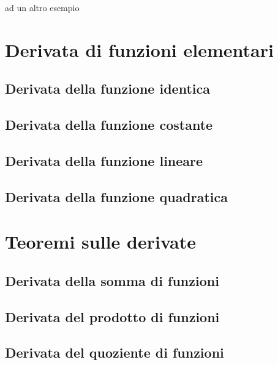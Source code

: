 ad un 
altro esempio

\section{Derivata di funzioni elementari}
\label{sec:differenziazione_derivatafelementari}

\subsection{Derivata della funzione identica}
\label{subsec:differenziazione_derivatafidentica}

\subsection{Derivata della funzione costante}
\label{subsec:differenziazione_derivatafcostante}

\subsection{Derivata della funzione lineare}
\label{subsec:differenziazione_derivataflineare}

\subsection{Derivata della funzione quadratica}
\label{subsec:differenziazione_derivatafquadratica}

\section{Teoremi sulle derivate}
\label{sec:differenziazione_teoremi}

\subsection{Derivata della somma di funzioni}
\label{subsec:differenziazione_derivatasomma}

\subsection{Derivata del prodotto di funzioni}
\label{subsec:differenziazione_derivataprodotto}

\subsection{Derivata del quoziente di funzioni}
\label{subsec:differenziazione_derivataquoziente}

